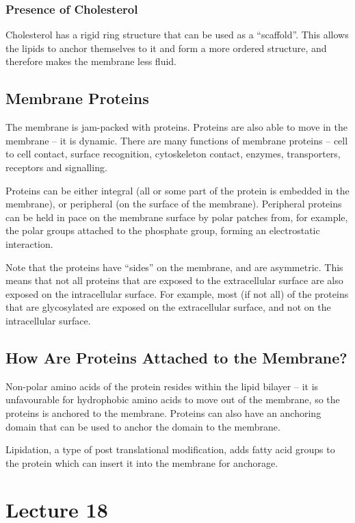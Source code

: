 \documentclass[a4paper, 12pt]{report}
\newcommand{\mychapter}[2]{
    \setcounter{chapter}{#1}
    \setcounter{section}{0}
    \chapter*{#2}
    \addcontentsline{toc}{chapter}{#2}
}
\begin{document}
\subsection{Presence of Cholesterol}

Cholesterol has a rigid ring structure that can be used as a ``scaffold''.
This allows the lipids to anchor themselves to it and form a more ordered structure, and therefore makes the membrane less fluid.

\section{Membrane Proteins}

The membrane is jam-packed with proteins.
Proteins are also able to move in the membrane -- it is dynamic.
There are many functions of membrane proteins -- cell to cell contact, surface recognition, cytoskeleton contact, enzymes, transporters, receptors and signalling.

Proteins can be either integral (all or some part of the protein is embedded in the membrane), or peripheral (on the surface of the membrane).
Peripheral proteins can be held in pace on the membrane surface by polar patches from, for example, the polar groups attached to the phosphate group, forming an electrostatic interaction.

Note that the proteins have ``sides'' on the membrane, and are asymmetric.
This means that not all proteins that are exposed to the extracellular surface are also exposed on the intracellular surface.
For example, most (if not all) of the proteins that are glycosylated are exposed on the extracellular surface, and not on the intracellular surface.

\section{How Are Proteins Attached to the Membrane?}

Non-polar amino acids of the protein resides within the lipid bilayer -- it is unfavourable for hydrophobic amino acids to move out of the membrane, so the proteins is anchored to the membrane.
Proteins can also have an anchoring domain that can be used to anchor the domain to the membrane.

Lipidation, a type of post translational modification, adds fatty acid groups to the protein which can insert it into the membrane for anchorage.

\mychapter{18}{Lecture 18}
\end{document}
